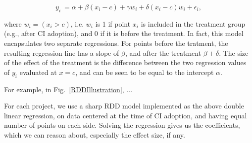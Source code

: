 \[y_i \ = \alpha + \beta(x_i-c) + \gamma w_i + \delta(x_i-c)w_i + \epsilon_i,\]

\noindent where $w_i = (x_i > c)$, i.e. $w_i$ is 1 if point $x_i$ is included in the treatment group (e.g., after CI adoption), and 0 if it is before the treatment.
In fact, this model encapsulates two separate regressions.
For points before the tratment, the resulting regression line has a slope of $\beta$, and after the treatment $\beta + \delta$.
The size of the effect of the treatment is the difference between the two regression values of $y_i$ evaluated at $x=c$, and can be seen to be equal to the intercept $\alpha$.

For example, in Fig.~\ref{RDDIllustration}, ...

For each project, we use a sharp RDD model implemented as the above double linear regression, on data centered at the time of CI adoption, and having equal number of points on each side.
Solving the regression gives us the coefficients, which we can reason about, especially the effect size, if any.
 




